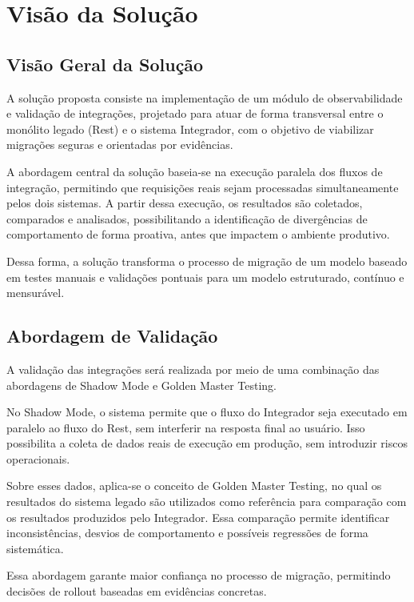 \section{Visão da Solução}

\subsection{Visão Geral da Solução}

A solução proposta consiste na implementação de um módulo de observabilidade e validação de integrações, projetado para atuar de forma transversal entre o monólito legado (Rest) e o sistema Integrador, com o objetivo de viabilizar migrações seguras e orientadas por evidências.

A abordagem central da solução baseia-se na execução paralela dos fluxos de integração, permitindo que requisições reais sejam processadas simultaneamente pelos dois sistemas. A partir dessa execução, os resultados são coletados, comparados e analisados, possibilitando a identificação de divergências de comportamento de forma proativa, antes que impactem o ambiente produtivo.

Dessa forma, a solução transforma o processo de migração de um modelo baseado em testes manuais e validações pontuais para um modelo estruturado, contínuo e mensurável.

\subsection{Abordagem de Validação}

A validação das integrações será realizada por meio de uma combinação das abordagens de Shadow Mode e Golden Master Testing.

No Shadow Mode, o sistema permite que o fluxo do Integrador seja executado em paralelo ao fluxo do Rest, sem interferir na resposta final ao usuário. Isso possibilita a coleta de dados reais de execução em produção, sem introduzir riscos operacionais.

Sobre esses dados, aplica-se o conceito de Golden Master Testing, no qual os resultados do sistema legado são utilizados como referência para comparação com os resultados produzidos pelo Integrador. Essa comparação permite identificar inconsistências, desvios de comportamento e possíveis regressões de forma sistemática.

Essa abordagem garante maior confiança no processo de migração, permitindo decisões de rollout baseadas em evidências concretas.

